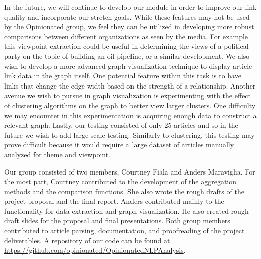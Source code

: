 \documentclass[12pt]{article}
\begin{document}
In the future, we will continue to develop our module in order to improve our link quality and incorporate our stretch goals. While these features may not be used by the Opinionated group, we feel they can be utilized in developing more robust comparisons between different organizations as seen by the media. For example this viewpoint extraction could be useful in determining the views of a political party on the topic of building an oil pipeline, or a similar development. We also wish to develop a more advanced graph visualization technique to display article link data in the graph itself. One potential feature within this task is to have links that change the edge width based on the strength of a relationship. Another avenue we wish to pursue in graph visualization is experimenting with the effect of clustering algorithms on the graph to better view larger clusters. One difficulty we may encounter in this experimentation is acquiring enough data to construct a relevant graph. Lastly, our testing consisted of only 25 articles and so in the future we wish to add large scale testing. Similarly to clustering, this testing may prove difficult because it would require a large dataset of articles manually analyzed for theme and viewpoint.

Our group consisted of two members, Courtney Fiala and Anders Maraviglia. For the most part, Courtney contributed to the development of the aggregation methods and the comparison functions. She also wrote the rough drafts of the project proposal and the final report. Anders contributed mainly to the functionality for data extraction and graph visualization. He also created rough draft slides for the proposal and final presentations. Both group members contributed to article parsing, documentation, and proofreading of the project deliverables. A repository of our code can be found at \url{https://github.com/opinionated/OpinionatedNLPAnalysis}.

\newpage
\end{document}
